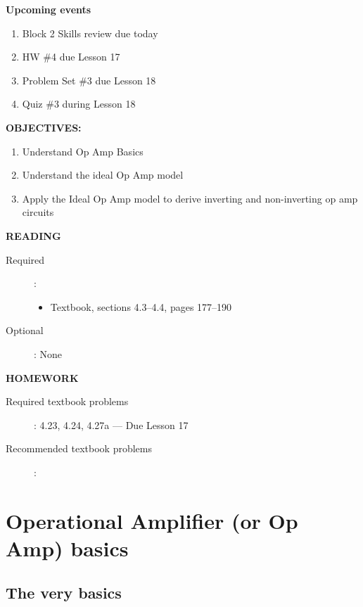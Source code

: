 \documentclass{handout}
\begin{document}
\maketitle

\textbf{Upcoming events}
\begin{enumerate}
\item Block 2 Skills review due today
\item HW \#4 due Lesson 17
\item Problem Set \#3 due Lesson 18
\item Quiz \#3 during Lesson 18
\end{enumerate}

\textbf{OBJECTIVES:}
\begin{enumerate}
\item Understand Op Amp Basics
\item Understand the ideal Op Amp model
\item Apply the Ideal Op Amp model to derive inverting and non-inverting op amp circuits
\end{enumerate}

\textbf{READING}
\begin{description}
\item [Required]:
\begin{itemize}
\item  Textbook, sections 4.3--4.4, pages 177--190
\end{itemize}
\item [Optional]: None
\end{description}

\textbf{HOMEWORK}
\begin{description}
\item [Required textbook problems]: 4.23, 4.24, 4.27a --- Due Lesson 17
\item [Recommended textbook problems]: 
\end{description}

\section{Operational Amplifier (or Op Amp) basics}
\subsection{The very basics}
\end{document}
